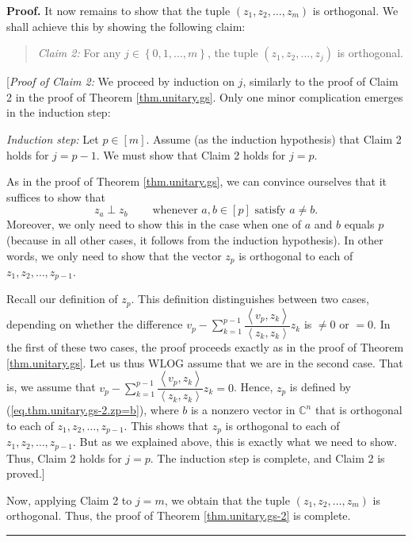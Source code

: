 \documentclass[numbers=enddot,12pt,final,onecolumn,notitlepage]{scrartcl}%
\numberwithin{exer}{subsection}
\theoremstyle{definition}
\newenvironment{statement}{\begin{quote}}{\end{quote}}
\newenvironment{proof}[1][Proof]{\noindent\textbf{#1.} }{\ \rule{0.5em}{0.5em}}
\let\sumnonlimits\sum
\renewcommand{\sum}{\sumnonlimits\limits}
\begin{document}
\begin{proof}
It now remains to show that the tuple $\left(  z_{1},z_{2},\ldots
,z_{m}\right)  $ is orthogonal. We shall achieve this by showing the following claim:

\begin{statement}
\textit{Claim 2:} For any $j\in\left\{  0,1,\ldots,m\right\}  $, the tuple
$\left(  z_{1},z_{2},\ldots,z_{j}\right)  $ is orthogonal.
\end{statement}

[\textit{Proof of Claim 2:} We proceed by induction on $j$, similarly to the
proof of Claim 2 in the proof of Theorem \ref{thm.unitary.gs}. Only one minor
complication emerges in the induction step:

\textit{Induction step:} Let $p\in\left[  m\right]  $. Assume (as the
induction hypothesis) that Claim 2 holds for $j=p-1$. We must show that Claim
2 holds for $j=p$.

As in the proof of Theorem \ref{thm.unitary.gs}, we can convince ourselves
that it suffices to show that
\begin{equation}
z_{a}\perp z_{b}\ \ \ \ \ \ \ \ \ \ \text{whenever }a,b\in\left[  p\right]
\text{ satisfy }a\neq b. \label{pf.thm.unitary.gs-2.13}%
\end{equation}
Moreover, we only need to show this in the case when one of $a$ and $b$ equals
$p$ (because in all other cases, it follows from the induction hypothesis). In
other words, we only need to show that the vector $z_{p}$ is orthogonal to
each of $z_{1},z_{2},\ldots,z_{p-1}$.

Recall our definition of $z_{p}$. This definition distinguishes between two
cases, depending on whether the difference $v_{p}-\sum_{k=1}^{p-1}%
\dfrac{\left\langle v_{p},z_{k}\right\rangle }{\left\langle z_{k}%
,z_{k}\right\rangle }z_{k}$ is $\neq0$ or $=0$. In the first of these two
cases, the proof proceeds exactly as in the proof of Theorem
\ref{thm.unitary.gs}. Let us thus WLOG assume that we are in the second case.
That is, we assume that $v_{p}-\sum_{k=1}^{p-1}\dfrac{\left\langle v_{p}%
,z_{k}\right\rangle }{\left\langle z_{k},z_{k}\right\rangle }z_{k}=0$. Hence,
$z_{p}$ is defined by (\ref{eq.thm.unitary.gs-2.zp=b}), where $b$ is a nonzero
vector in $\mathbb{C}^{n}$ that is orthogonal to each of $z_{1},z_{2}%
,\ldots,z_{p-1}$. This shows that $z_{p}$ is orthogonal to each of
$z_{1},z_{2},\ldots,z_{p-1}$. But as we explained above, this is exactly what
we need to show. Thus, Claim 2 holds for $j=p$. The induction step is
complete, and Claim 2 is proved.] \medskip

Now, applying Claim 2 to $j=m$, we obtain that the tuple $\left(  z_{1}%
,z_{2},\ldots,z_{m}\right)  $ is orthogonal. Thus, the proof of Theorem
\ref{thm.unitary.gs-2} is complete.
\end{proof}
\end{document}
